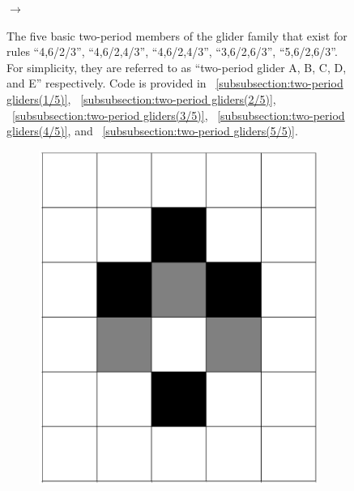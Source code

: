 \documentclass[12pt]{article}
\numberwithin{figure}{section} %
\begin{document}
\begin{figure}[H]
\begin{subfigure}{0.3\textwidth}
     \subcaption{}
   \end{subfigure}
      {\LARGE$\xrightarrow{}$}
   \setcounter{subfigure}{0}
   \caption[Two-period gliders]{The five basic two-period members of the glider family that exist for rules “4,6/2/3”, “4,6/2,4/3”, “4,6/2,4/3”, “3,6/2,6/3”, “5,6/2,6/3”. For simplicity, they are referred to as “two-period glider A, B, C, D, and E” respectively. Code is provided in ~\ref{subsubsection:two-period gliders(1/5)}, ~\ref{subsubsection:two-period gliders(2/5)}, ~\ref{subsubsection:two-period gliders(3/5)}, ~\ref{subsubsection:two-period gliders(4/5)}, and ~\ref{subsubsection:two-period gliders(5/5)}.}
   \label{fig:two-period gliders}
   \vspace{-1.5em}
\end{figure}

\begin{figure}[H]
 \begin{subfigure}{0.18\textwidth}
     \centering
     \includegraphics[angle=270,width=\linewidth]{Section4/8.0}
     \subcaption{}
   \end{subfigure}
     \begin{subfigure}{0.18\textwidth}

\end{subfigure}
\end{figure}
\end{document}
